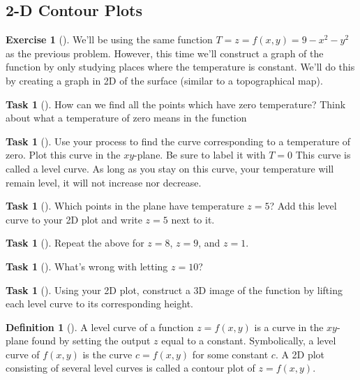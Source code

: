\documentclass[10pt,]{book}
\theoremstyle{plain}
\theoremstyle{definition}
\newtheorem{definition}[theorem]{Definition}
\theoremstyle{definition}
\theoremstyle{definition}
\theoremstyle{definition}
\newtheorem{exploration}[project]{Exercise}
\newtheorem{task}[project]{Task}
\theoremstyle{definition}
\numberwithin{equation}{section}
\begin{document}
\subsection[{2-D Contour Plots}]{2-D Contour Plots}\label{subsection-23}
\begin{exploration}[]\label{prob_intro_to_contour_plots}
\larsonfive{ }We'll be using the same function \(T=z=f(x,y)=9-x^2-y^2\) as the previous problem. However, this time we'll construct a graph of the function by only studying places where the temperature is constant. We'll do this by creating a graph in 2D of the surface (similar to a topographical map). %
\begin{task}[]\label{task-213}
How can we find all the points which have zero temperature? Think about what a temperature of zero means in the function%
%
\end{task}
\begin{task}[]\label{task-214}
Use your process to find the curve corresponding to a temperature of zero. Plot this curve in the \(xy\)-plane. Be sure to label it with \(T=0\) This curve is called a level curve. As long as you stay on this curve, your temperature will remain level, it will not increase nor decrease.%
\end{task}
\begin{task}[]\label{task-215}
Which points in the plane have temperature \(z=5\)?  Add this level curve to your 2D plot and write \(z=5\) next to it.%
\end{task}
\begin{task}[]\label{task-216}
Repeat the above for \(z=8\), \(z=9\), and \(z=1\).  %
\end{task}
\begin{task}[]\label{task-217}
What's wrong with letting \(z=10\)?%
\end{task}
\begin{task}[]\label{task-218}
Using your 2D plot, construct a 3D image of the function by lifting each level curve to its corresponding height.%
\end{task}
\end{exploration}
\begin{definition}[{}]\label{definition-22}
A level curve of a function \(z=f(x,y)\) is a curve in the \(xy\)-plane found by setting the output \(z\) equal to a constant. Symbolically, a level curve of \(f(x,y)\) is the curve \(c=f(x,y)\) for some constant \(c\). A 2D plot consisting of several level curves is called a contour plot of \(z=f(x,y)\).%
\end{definition}
\typeout{************************************************}
\typeout{************************************************}
\end{document}
